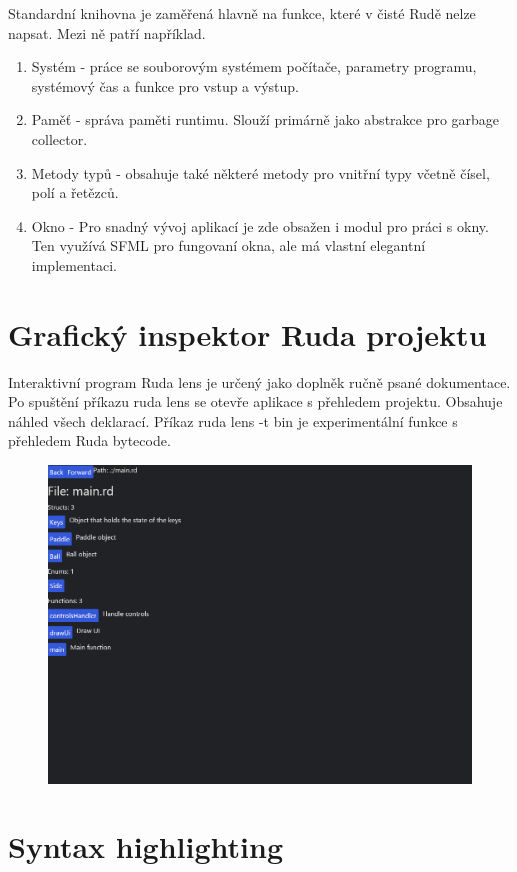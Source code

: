 \documentclass[12pt, a4paper,
twoside,        %
openright
]{report}
\begin{document}
Standardní knihovna je zaměřená hlavně na funkce, které v čisté Rudě nelze napsat. 
Mezi ně patří například.

\begin{enumerate}
	\item Systém - práce se souborovým systémem počítače, parametry programu, systémový čas a funkce pro vstup a výstup.
	\item Paměť - správa paměti runtimu. Slouží primárně jako abstrakce pro garbage collector.
	\item Metody typů - obsahuje také některé metody pro vnitřní typy včetně čísel, polí a řetězců.
	\item Okno - Pro snadný vývoj aplikací je zde obsažen i modul pro práci s okny. Ten využívá SFML pro fungovaní okna, ale má vlastní elegantní implementaci.
\end{enumerate}

\section{Grafický inspektor Ruda projektu}

Interaktivní program Ruda lens je určený jako doplněk ručně psané dokumentace. Po spuštění příkazu ruda lens se otevře aplikace s přehledem projektu. Obsahuje náhled všech deklarací. Příkaz ruda lens -t bin je experimentální funkce s přehledem Ruda bytecode.

\begin{figure}[h]
	\centering
	\includegraphics[width=0.8\linewidth]{image/lens.png}
\end{figure}

\section{Syntax highlighting}
\end{document}
